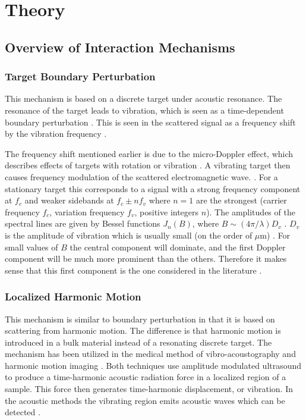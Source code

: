 \documentclass[10pt,a4paper]{eitExjobb}
\begin{document}
	\chapter{Theory}
	
	\section{Overview of Interaction Mechanisms}
	
	\subsection{Target Boundary Perturbation}
	This mechanism is based on a discrete target under acoustic resonance. The resonance of the target leads to vibration, which is seen as a time-dependent boundary perturbation \cite{Buerkle2007}. This is seen in the scattered signal as a frequency shift by the vibration frequency \cite{Sarabandi2003}. 
	
	The frequency shift mentioned earlier is due to the micro-Doppler effect, which describes effects of targets with rotation or vibration \cite{Buerkle2007}. A vibrating target then causes frequency modulation of the scattered electromagnetic wave. \cite{Chen2006}. For a stationary target this corresponds to a signal with a strong frequency component at $f_c$ and weaker sidebands at $f_c \pm n f_v$ where $n=1$ are the strongest (carrier frequency $f_c$, variation frequency $f_v$, positive integers $n$). The amplitudes of the spectral lines are given by Bessel functions $J_n(B)$, where $B \sim (4\pi/\lambda)D_v$ \cite{Chen2006}. $D_v$ is the amplitude of vibration which is usually small (on the order of $\mu$m) \cite{Buerkle2007}\cite{Top2014}. For small values of $B$ the central component will dominate, and the first Doppler component will be much more prominent than the others. Therefore it makes sense that this first component is the one considered in the literature \cite{Buerkle2007}.
	
	\subsection{Localized Harmonic Motion}
	This mechanism is similar to boundary perturbation in that it is based on scattering from harmonic motion. The difference is that harmonic motion is introduced in a bulk material instead of a resonating discrete target. The mechanism has been utilized in the medical method of vibro-acoustography and harmonic motion imaging \cite{Wang2018}. Both techniques use amplitude modulated ultrasound to produce a time-harmonic acoustic radiation force in a localized region of a sample. This force then generates time-harmonic displacement, or vibration. In the acoustic methods the vibrating region emits acoustic waves which can be detected \cite{Fatemi1998}\cite{Konofagou2003}.
	
\end{document}
